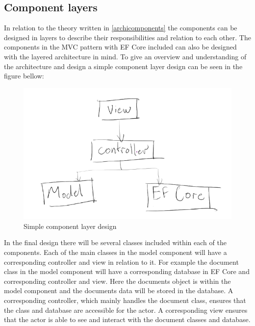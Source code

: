 \subsection{Component layers}
In relation to the theory written in \cref{archicomponents} the components can be designed in layers to describe their responsibilities and relation to each other.
The components in the MVC pattern with EF Core included can also be designed with the layered architecture in mind.
To give an overview and understanding of the architecture and design a simple component layer design can be seen in the figure bellow:

\begin{figure}[H]
	\centering
	\includegraphics[width=1\textwidth]{billeder/simplecomponents.png}
	\caption{Simple component layer design}
\end{figure}

In the final design there will be several classes included within each of the components.
Each of the main classes in the model component will have a corresponding controller and view in relation to it.
For example the document class in the model component will have a corresponding database in EF Core and corresponding controller and view.
Here the documents object is within the model component and the documents data will be stored in the database.
A corresponding controller, which mainly handles the document class, ensures that the class and database are accessible for the actor.
A corresponding view ensures that the actor is able to see and interact with the document classes and database.
